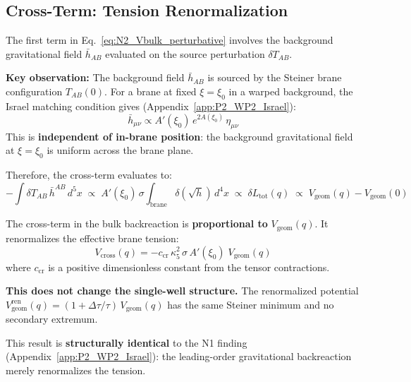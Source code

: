 \subsection{Cross-Term: Tension Renormalization}
\label{sec:N2:cross}

The first term in Eq.~\eqref{eq:N2_Vbulk_perturbative} involves the
background gravitational field $\bar{h}_{AB}$ evaluated on the source
perturbation $\delta T_{AB}$.

\textbf{Key observation:} The background field $\bar{h}_{AB}$ is
sourced by the Steiner brane configuration $T_{AB}(0)$. For a brane
at fixed $\xi = \xi_0$ in a warped background, the Israel matching
condition gives (Appendix~\ref{app:P2_WP2_Israel}):
\begin{equation}
    \bar{h}_{\mu\nu} \propto A'(\xi_0)\,e^{2A(\xi_0)}\,\eta_{\mu\nu}
    \label{eq:N2_hbar}
\end{equation}
This is \textbf{independent of in-brane position}: the background
gravitational field at $\xi = \xi_0$ is uniform across the brane
plane. \tagDc

Therefore, the cross-term evaluates to:
\begin{equation}
    -\int \delta T_{AB}\, \bar{h}^{AB}\, d^5x
    \;\propto\; A'(\xi_0)\,\sigma \int_{\mathrm{brane}} \delta(\sqrt{h})\, d^4x
    \;\propto\; \delta L_{\mathrm{tot}}(q)
    \;\propto\; V_{\mathrm{geom}}(q) - V_{\mathrm{geom}}(0)
    \label{eq:N2_cross_result}
\end{equation}

\begin{resultbox}[title=Cross-Term Result]
The cross-term in the bulk backreaction is \textbf{proportional to}
$V_{\mathrm{geom}}(q)$. It renormalizes the effective brane tension:
\begin{equation}
    V_{\mathrm{cross}}(q) = -c_{\mathrm{cr}}\,\kappa_5^2\,\sigma\,
    A'(\xi_0)\;V_{\mathrm{geom}}(q)
\end{equation}
where $c_{\mathrm{cr}}$ is a positive dimensionless constant from the
tensor contractions.

\textbf{This does not change the single-well structure.} The renormalized
potential $V_{\mathrm{geom}}^{\mathrm{ren}}(q) = (1 + \Delta\tau/\tau)\,
V_{\mathrm{geom}}(q)$ has the same Steiner minimum and no secondary
extremum.

This result is \textbf{structurally identical} to the N1 finding
(Appendix~\ref{app:P2_WP2_Israel}): the leading-order gravitational
backreaction merely renormalizes the tension. \tagDc
\end{resultbox}

